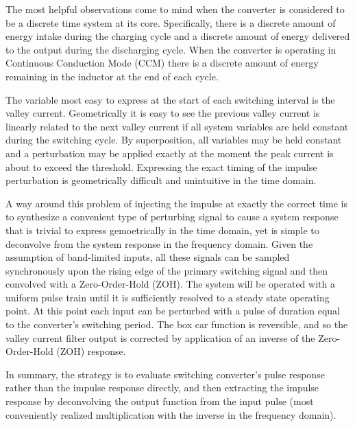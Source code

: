 \documentclass[conference]{IEEEtran}
\begin{document}
The most helpful observations come to mind when the converter is considered to be a discrete time system at its core.  Specifically, there is a discrete amount of energy intake during the charging cycle and a discrete amount of energy delivered to the output during the discharging cycle.  When the converter is operating in Continuous Conduction Mode (CCM) there is a discrete amount of energy remaining in the inductor at the end of each cycle.

The variable most easy to express at the start of each switching interval is the valley current.  Geometrically it is easy to see the previous valley current is linearly related to the next valley current if all system variables are held constant during the switching cycle.  By superposition, all variables may be held constant and a perturbation may be applied exactly at the moment the peak current is about to exceed the threshold. Expressing the exact timing of the impulse perturbation is geometrically difficult and unintuitive in the time domain.

A way around this problem of injecting the impulse at exactly the correct time is to synthesize a convenient type of perturbing signal to cause a system response that is trivial to express gemoetrically in the time domain, yet is simple to deconvolve from the system response in the frequency domain.  Given the assumption of band-limited inputs, all these signals can be sampled synchronously upon the rising edge of the primary switching signal and then convolved with a Zero-Order-Hold (ZOH).  The system will be operated with a uniform pulse train until it is sufficiently resolved to a steady state operating point.  At this point each input can be perturbed with a pulse of duration equal to the converter's switching period.  The box car function is reversible, and so the valley current filter output is corrected by application of an inverse of the Zero-Order-Hold (ZOH) response. 

In summary, the strategy is to evaluate switching converter's pulse response rather than the impulse response directly, and then extracting the impulse response by deconvolving the output function from the input pulse (most conveniently realized multiplication with the inverse in the frequency domain).
\end{document}
